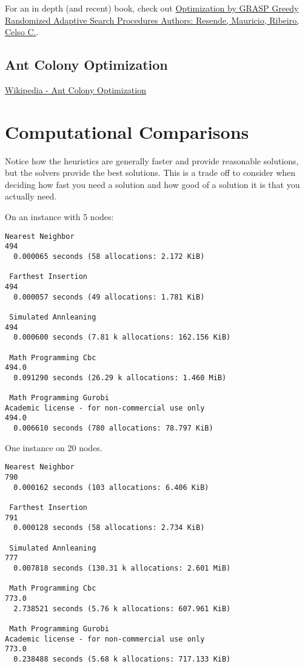 For an in depth (and recent) book, check out
\href{https://www.springer.com/gp/book/9781493965281}{Optimization by GRASP
Greedy Randomized Adaptive Search Procedures
Authors: Resende, Mauricio, Ribeiro, Celso C.}.

\subsection{Ant Colony Optimization}
\href{https://en.wikipedia.org/wiki/Ant_colony_optimization_algorithms}{Wikipedia - Ant Colony Optimization}

\section{Computational Comparisons}
Notice how the heuristics are generally faster and provide reasonable solutions, but the solvers provide the best solutions.  This is a trade off to consider when deciding how fast you need a solution and how good of a solution it is that you actually need.  


On an instance with 5 nodes:
\begin{verbatim}
Nearest Neighbor
494
  0.000065 seconds (58 allocations: 2.172 KiB)

 Farthest Insertion
494
  0.000057 seconds (49 allocations: 1.781 KiB)

 Simulated Annleaning
494
  0.000600 seconds (7.81 k allocations: 162.156 KiB)

 Math Programming Cbc
494.0
  0.091290 seconds (26.29 k allocations: 1.460 MiB)

 Math Programming Gurobi
Academic license - for non-commercial use only
494.0
  0.006610 seconds (780 allocations: 78.797 KiB)
  \end{verbatim}
  
  
  One instance on 20 nodes.
  \begin{verbatim}
Nearest Neighbor
790
  0.000162 seconds (103 allocations: 6.406 KiB)

 Farthest Insertion
791
  0.000128 seconds (58 allocations: 2.734 KiB)

 Simulated Annleaning
777
  0.007818 seconds (130.31 k allocations: 2.601 MiB)

 Math Programming Cbc
773.0
  2.738521 seconds (5.76 k allocations: 607.961 KiB)

 Math Programming Gurobi
Academic license - for non-commercial use only
773.0
  0.238488 seconds (5.68 k allocations: 717.133 KiB)
  \end{verbatim}
  
